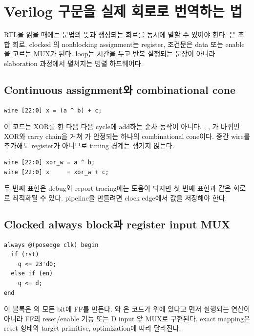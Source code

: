 \chapter{Verilog 구문을 실제 회로로 번역하는 법}

\begin{summarybox}[이 장의 관점]
RTL을 읽을 때에는 문법의 뜻과 생성되는 회로를 동시에 말할 수 있어야 한다.
은 조합 회로, clocked 의 nonblocking assignment는
register, 조건문은 data 또는 enable을 고르는 MUX가 된다. loop는 시간을 두고
반복 실행되는 문장이 아니라 elaboration 과정에서 펼쳐지는 병렬 하드웨어다.
\end{summarybox}

\section{Continuous assignment와 combinational cone}

\begin{lstlisting}
wire [22:0] x = (a ^ b) + c;
\end{lstlisting}

이 코드는 XOR를 한 다음 다음 cycle에 add하는 순차 동작이 아니다. ,
, 가 바뀌면 XOR와 carry chain을 거쳐 가 안정되는
하나의 combinational cone이다. 중간 wire를 추가해도 register가 아니므로 timing
경계는 생기지 않는다.

\begin{lstlisting}
wire [22:0] xor_w = a ^ b;
wire [22:0] x     = xor_w + c;
\end{lstlisting}

두 번째 표현은 debug와 report tracing에는 도움이 되지만 첫 번째 표현과 같은
회로로 최적화될 수 있다. pipeline을 만들려면 clock edge에서 값을 저장해야 한다.

\section{Clocked always block과 register input MUX}

\begin{lstlisting}
always @(posedge clk) begin
  if (rst)
    q <= 23'd0;
  else if (en)
    q <= d;
end
\end{lstlisting}

이 블록은 의 모든 bit에 FF를 만든다. 와 은
코드가 위에 있다고 먼저 실행되는 연산이 아니라 FF의 reset/enable 기능 또는
D input 앞 MUX로 구현된다. exact mapping은 reset 형태와 target primitive,
optimization에 따라 달라진다.

